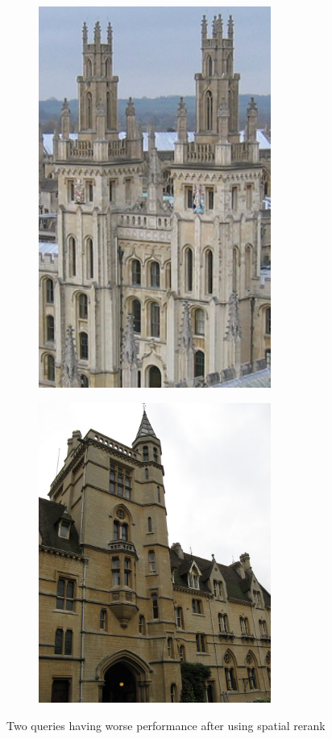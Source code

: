 \begin{figure}
  
		\begin{subfigure}{.5\textwidth}
		\centering
    \includegraphics[width=3.0in]{all_souls_4_query.png}
		\end{subfigure}
		
		\begin{subfigure}{.5\textwidth}
		\centering
		\includegraphics[width=3.0in]{balliol_2_query.png}
		\end{subfigure}
		
    \caption{Two queries having worse performance after using spatial rerank}
    \label{fig:bad_queries}
\end{figure}

